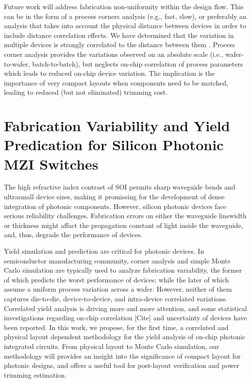 \documentclass[journal]{spie}
\begin{document}
Future work will address fabrication non-uniformity within the design flow.  This can be in the form of a process corners analysis (e.g., fast, slow), or preferably an analysis that takes into account the physical distance between devices in order to include distance correlation effects.  We have determined that the variation in multiple devices is strongly correlated to the distance between them \cite{chrostowski2014impact}.  Process corner analysis provides the variations observed on an absolute scale (i.e., wafer-to-wafer, batch-to-batch), but neglects on-chip correlation of process parameters which leads to reduced on-chip device variation.  The implication is the importance of very compact layouts when components need to be matched, leading to reduced (but not eliminated) trimming cost.  



\graphicspath{{../figs_chris/}}


\section{Fabrication Variability and Yield Predication for Silicon Photonic MZI Switches}
\label{sec:variability}
The high refractive index contrast of SOI permits sharp waveguide bends and ultrasmall device sizes, making it promissing for the development of dense integration of photonic components. However, silicon photonic devices face serious reliability challenges. Fabrication errors on either the waveguide linewidth or thickness might affact the propagation constant of light inside the waveguide, and, thus, degrade the performance of devices. 

Yield simulation and prediction are critical for photonic devices. In semiconductor manufacturing community, corner analysis and simple Monte Carlo simulation are typically used to analyze fabrication variability, the former of which predicts the worst performance of devices; while the later of which assume a uniform process variation across a wafer. However, neither of them captures die-to-die, device-to-device, and intra-device correlated variations. Correlated yield analysis is driving more and more attention, and some statistical investigations regarding on-chip correlation [Cite] and uncertainty of devices have been reported. In this work, we propose, for the first time, a correlated and physical layout dependent methodology for the yield analysis of on-chip photonic integrated circuits. From physical layout to Monte Carlo simulation, our methodology will provides an insight into the significance of compact layout for photonic designs, and offers a useful tool for post-layout verification and power trimming estimation.
\end{document}
